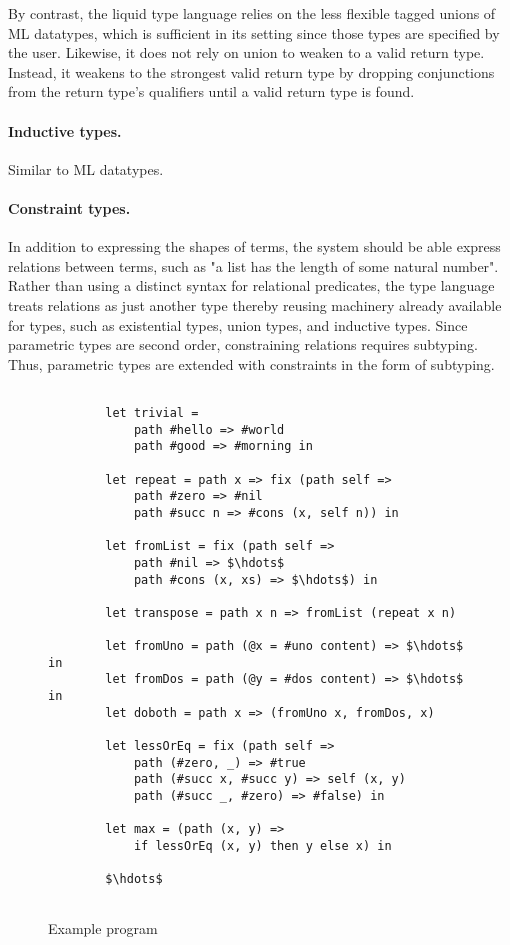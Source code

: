 \documentclass[acmsmall]{acmart}
\begin{document}
By contrast, the liquid type language relies on the less flexible tagged unions of ML datatypes, 
which is sufficient in its setting since those types are specified by the user. 
Likewise, it does not rely on union to weaken to a valid return type. 
Instead, it weakens to the strongest valid return type by dropping conjunctions from 
the return type's qualifiers until a valid return type is found.

\paragraph{Inductive types.} Similar to ML datatypes.

\paragraph{Constraint types.}
In addition to expressing the shapes of terms, the system should be able express relations between terms,
such as "a list has the length of some natural number".
Rather than using a distinct syntax for relational predicates, 
the type language treats relations as just another type thereby reusing machinery already 
available for types, such as existential types, union types, and inductive types.
Since parametric types are second order, constraining relations requires subtyping.
Thus, parametric types are extended with constraints in the form of subtyping.



\begin{figure*}[h]

    \begin{lstlisting}[mathescape=true]

        let trivial =
            path #hello => #world
            path #good => #morning in

        let repeat = path x => fix (path self =>
            path #zero => #nil
            path #succ n => #cons (x, self n)) in

        let fromList = fix (path self =>
            path #nil => $\hdots$
            path #cons (x, xs) => $\hdots$) in

        let transpose = path x n => fromList (repeat x n)

        let fromUno = path (@x = #uno content) => $\hdots$ in
        let fromDos = path (@y = #dos content) => $\hdots$ in
        let doboth = path x => (fromUno x, fromDos, x)

        let lessOrEq = fix (path self =>
            path (#zero, _) => #true
            path (#succ x, #succ y) => self (x, y)
            path (#succ _, #zero) => #false) in

        let max = (path (x, y) => 
            if lessOrEq (x, y) then y else x) in

        $\hdots$


    \end{lstlisting}

\caption{Example program}
\end{figure*}
\end{document}
